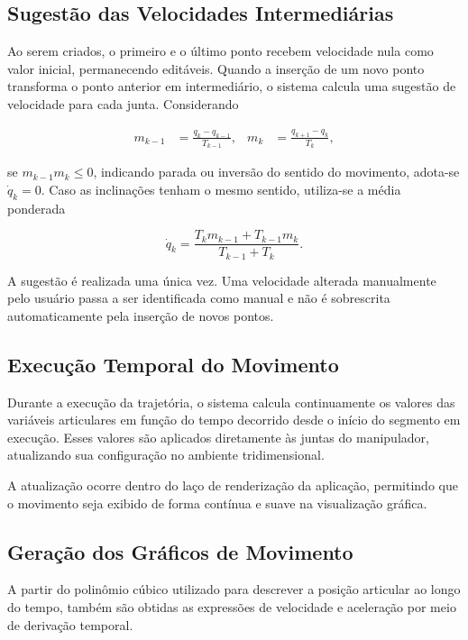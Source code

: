 \subsection{Sugestão das Velocidades Intermediárias}

Ao serem criados, o primeiro e o último ponto recebem velocidade nula como valor inicial, permanecendo editáveis. Quando a inserção de um novo ponto transforma o ponto anterior em intermediário, o sistema calcula uma sugestão de velocidade para cada junta. Considerando

\begin{align}
m_{k-1} &= \frac{q_k-q_{k-1}}{T_{k-1}}, &
m_k &= \frac{q_{k+1}-q_k}{T_k},
\end{align}

se $m_{k-1}m_k\leq0$, indicando parada ou inversão do sentido do movimento, adota-se $\dot{q}_k=0$. Caso as inclinações tenham o mesmo sentido, utiliza-se a média ponderada

\begin{equation}
\dot{q}_k=
\frac{T_km_{k-1}+T_{k-1}m_k}{T_{k-1}+T_k}.
\end{equation}

A sugestão é realizada uma única vez. Uma velocidade alterada manualmente pelo usuário passa a ser identificada como manual e não é sobrescrita automaticamente pela inserção de novos pontos.

\subsection{Execução Temporal do Movimento}

Durante a execução da trajetória, o sistema calcula continuamente os valores das variáveis articulares em função do tempo decorrido desde o início do segmento em execução. Esses valores são aplicados diretamente às juntas do manipulador, atualizando sua configuração no ambiente tridimensional.

A atualização ocorre dentro do laço de renderização da aplicação, permitindo que o movimento seja exibido de forma contínua e suave na visualização gráfica.

\subsection{Geração dos Gráficos de Movimento}

A partir do polinômio cúbico utilizado para descrever a posição articular ao longo do tempo, também são obtidas as expressões de velocidade e aceleração por meio de derivação temporal.

